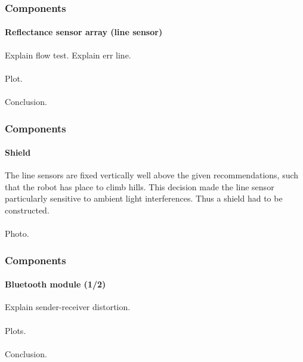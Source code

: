 \documentclass{beamer}
\begin{document}
\begin{frame}
\frametitle{Components}
\framesubtitle{Reflectance sensor array (line sensor)}
Explain flow test. Explain err line.\\~\\
Plot.\\~\\
Conclusion.
\end{frame}


\begin{frame}
\frametitle{Components}
\framesubtitle{Shield}
The line sensors are fixed vertically well above the given recommendations, such that the robot has place to climb hills. This decision made the line sensor 
particularly sensitive to ambient light interferences. Thus a shield had to be constructed. \\~\\
Photo.
\end{frame}


\begin{frame}
\frametitle{Components}
\framesubtitle{Bluetooth module (1/2)}
Explain sender-receiver distortion.\\~\\
Plots.\\~\\
Conclusion.
\end{frame}

\end{document}
